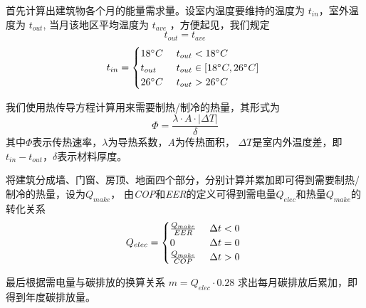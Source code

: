 \documentclass[a4paper, 12pt]{article}
\numberwithin{equation}{section}
\begin{document}
            首先计算出建筑物各个月的能量需求量。设室内温度要维持的温度为 $ t_{in} $，室外温度为 $ t_{out} $,
            当月该地区平均温度为 $ t_{ave} $ ，方便起见，我们规定
            \begin{equation*}
                t_{out} = t_{ave}
            \end{equation*}
            \begin{equation*}
                t_{in} =
                \begin{cases}
                    18 ^{\circ}C & \text{ $ t_{out} < 18 ^{\circ}C $ } \\
                    t_{out} & \text{ $ t_{out} \in [18 ^{\circ}C, 26 ^{\circ}C] $ } \\
                    26 ^{\circ}C & \text{ $ t_{out} > 26 ^{\circ}C $}
                \end{cases}
            \end{equation*}

            我们使用热传导方程计算用来需要制热/制冷的热量，其形式为
            \begin{equation}
                \Phi = \frac{\lambda \cdot A \cdot |\Delta T|}{\delta}
            \end{equation}
            其中$ \Phi $表示传热速率，$ \lambda $为导热系数，\textit{A}为传热面积，
            $ \Delta T $是室内外温度差，即$ t_{in} - t_{out} $，$ \delta $表示材料厚度。

            将建筑分成墙、门窗、房顶、地面四个部分，分别计算并累加即可得到需要制热/制冷的热量，设为$ Q_{make} $，
            由\textit{COP}和\textit{EER}的定义可得到需电量$ Q_{elec} $和热量$ Q_{make} $的转化关系
            \begin{equation}
                Q_{elec} =
                \begin{cases}
                    \frac{Q_{make}}{EER} & \text{ $ \Delta t < 0 $ } \\
                    0 & \text{ $ \Delta t = 0 $ } \\
                    \frac{Q_{make}}{COP} & \text{ $ \Delta t > 0 $ }
                \end{cases}
            \end{equation}

            最后根据需电量与碳排放的换算关系 $ m = Q_{elec} \cdot 0.28 $ 求出每月碳排放后累加，即得到年度碳排放量。


    {}
\end{document}
